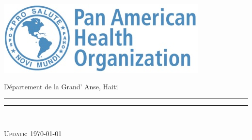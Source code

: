 \begin{titlepage}
\hspace*{-1cm}\begin{minipage}[0.1\textheight]{5cm}
\vspace{0pt}
\includegraphics[height=0.1\textheight]{./figure/logo_paho.png}
\end{minipage}
\hspace*{1cm}\begin{minipage}{11.3cm}
\vspace{0pt}
\begin{flushright}
\begin{spacing}{1.0}
{\LARGE Département de la Grand’ Anse, Haiti} \\
\end{spacing}
\end{flushright}
\end{minipage}

\hspace*{-1cm}\begin{minipage}[t]{5cm}
\vspace{0pt}
\textcolor{whoblue!15}{\rule{5cm}{0.55\textheight}}
\end{minipage}
\hspace*{1cm}\begin{minipage}[t]{11.3cm}
\vspace{0pt}
\textcolor{whoblue}{\rule{11.3cm}{0.5mm}}\\[0.525\textheight]
\begin{flushright}
\cleanlookdateon \textsc{\large Update: \today}
\end{flushright}
\end{minipage}

\end{titlepage}
